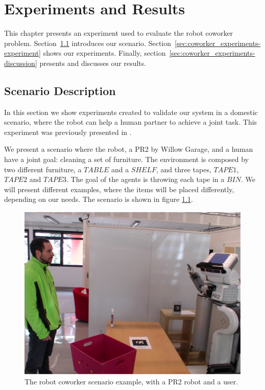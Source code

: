 \chapter{Experiments and Results} %

\label{chapter:coworker_experiments} %


This chapter presents an experiment used to evaluate the robot coworker problem. Section~\ref{sec:coworker_experiments-scenario} introduces our scenario. Section~\ref{sec:coworker_experiments-experiment} shows our experiments. Finally, section~\ref{sec:coworker_experiments-discussion} presents and discusses our results.


\section{Scenario Description}
\label{sec:coworker_experiments-scenario}
In this section we show experiments created to validate our system in a domestic scenario, where the robot can help a human partner to achieve a joint task. This experiment was previously presented in \cite{fioreiser2014}.


We present a scenario where the robot, a PR2 by Willow Garage, and a human have a joint goal: cleaning a set of furniture. 
The environment is composed by two different furniture, a $TABLE$ and a $SHELF$, and three tapes,
 $TAPE1$, $TAPE2$ and $TAPE3$. The goal of the agents is throwing each tape in a $BIN$. We will present different examples, where the items will be placed differently, depending on our needs. The scenario is shown in figure \ref{fig:coworker_results-pr2helper}.

 \begin{figure}[ht!]
 	\centering
 	\includegraphics[scale=0.45]{img/coworker/results/experiment.pdf}
 	\caption{The robot coworker scenario example, with a PR2 robot and a user.}
 	\label{fig:coworker_results-pr2helper}
 \end{figure}

